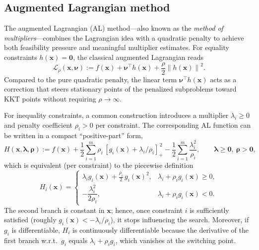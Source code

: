 \documentclass[11pt,a4paper]{article}
\numberwithin{equation}{section}
\numberwithin{figure}{section}
\numberwithin{table}{section}
\theoremstyle{definition}
\newcommand{\norm}[1]{\left\lVert #1 \right\rVert}
\newcommand{\pos}[1]{\left[#1\right]_+}
\begin{document}
\subsection{Augmented Lagrangian method}\label{subsec:al-method}
The augmented Lagrangian (AL) method---also known as the \emph{method of multipliers}---combines the Lagrangian idea with a quadratic penalty to achieve both feasibility pressure and meaningful multiplier estimates.\cite{NocedalWright}
For equality constraints $h(\bm{x})=\bm{0}$, the classical augmented Lagrangian reads
\begin{equation}
\label{eq:al-equality}
  \mathcal{L}_\rho(\bm{x},\bm{\nu})
  := f(\bm{x}) + \bm{\nu}^\top h(\bm{x}) + \frac{\rho}{2}\norm{h(\bm{x})}^2.
\end{equation}
Compared to the pure quadratic penalty, the linear term $\bm{\nu}^\top h(\bm{x})$ acts as a correction that steers stationary points of the penalized subproblems toward KKT points without requiring $\rho\to\infty$.

For inequality constraints, a common construction introduces a multiplier $\lambda_i\ge 0$ and penalty coefficient $\rho_i>0$ per constraint.\cite{Atamna2016,DufosseHansen} The corresponding AL function can be written in a compact ``positive-part'' form,
\begin{equation}
\label{eq:al-inequality-prox}
  H(\bm{x},\bm{\lambda},\bm{\rho})
  := f(\bm{x})
  + \frac{1}{2}\sum_{i=1}^m \rho_i\, \pos{g_i(\bm{x}) + \lambda_i/\rho_i}^{\,2}
  - \frac{1}{2}\sum_{i=1}^m \frac{\lambda_i^2}{\rho_i},
  \qquad \bm{\lambda}\ge \bm{0},\ \bm{\rho}>\bm{0},
\end{equation}
which is equivalent (per constraint) to the piecewise definition
\begin{equation}
\label{eq:al-inequality-piecewise}
  H_i(\bm{x})
  =
  \begin{cases}
    \lambda_i g_i(\bm{x}) + \frac{\rho_i}{2}\, g_i(\bm{x})^2, & \lambda_i + \rho_i g_i(\bm{x}) \ge 0,\\[2mm]
    -\dfrac{\lambda_i^2}{2\rho_i}, & \lambda_i + \rho_i g_i(\bm{x}) < 0.
  \end{cases}
\end{equation}
The second branch is constant in $\bm{x}$; hence, once constraint $i$ is sufficiently satisfied (roughly $g_i(\bm{x})<-\lambda_i/\rho_i$), it stops influencing the search. Moreover, if $g_i$ is differentiable, $H_i$ is continuously differentiable because the derivative of the first branch w.r.t.\ $g_i$ equals $\lambda_i+\rho_i g_i$, which vanishes at the switching point.\cite{DufosseHansen}
\end{document}
